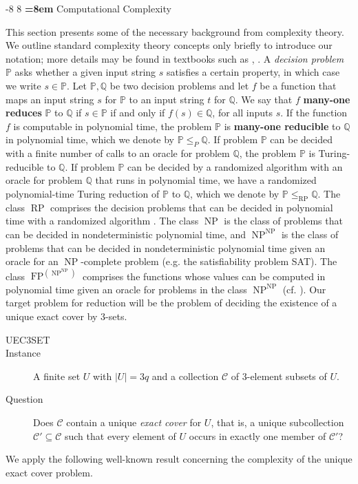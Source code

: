 \documentclass{elsarticle}%
\makeatletter
\renewcommand\subsection{\@startsection {subsection}{1}{\z@}%
  {-8\p@ \@plus -4\p@ \@minus -4\p@}%
                       {8\p@ \@plus 4\p@ \@minus 4\p@}%
                                   {\normalfont\large\bfseries\boldmath
                                   \rightskip=\z@ \@plus 8em\pretolerance=10000 }}
\DeclareMathOperator{\RP}{\mathbf{\mathrm{RP}}}
\DeclareMathOperator{\FP}{\mathbf{\mathrm{FP}}}
\DeclareMathOperator{\NP}{\mathbf{\mathrm{NP}}}
\newcommand{\partC}{\mathcal{C}}
\renewcommand{\P}{\mathbb{P}}
\newcommand{\Q}{\mathbb{Q}}
\makeatother
\begin{document}
\subsection{Computational Complexity} \label{sec:complexity-back}

This section presents some of the necessary background from complexity theory. We outline standard complexity theory concepts only briefly to introduce our notation; more details may be found in textbooks such as \cite{papadimitriou94:_comput}, \cite{Rothe2005}.
A {\em decision problem} $\P$ asks whether a given input string $s$ satisfies a certain property, in which case we write $s \in \P$. Let $\P,\Q$ be two decision problems and let $f$ be a function that maps an input string $s$ for $\P$ to an input string $t$ for $\Q$. We say that $f$ \textbf{many-one reduces} $\P$ to $\Q$ if $s \in \P$ if and only if $f(s) \in \Q$, for all inputs $s$. If the function $f$ is computable in polynomial time, the problem $\P$ is \textbf{ many-one reducible} to $\Q$ in polynomial time, which we denote by $\P \leq_{P} \Q$. If problem $\P$ can be decided with a finite number of calls to an oracle for problem $\Q$, the problem $\P$ is Turing-reducible to $\Q$. If problem $\P$ can be decided by a randomized algorithm with an oracle for problem $\Q$ that runs in polynomial time, we have a randomized polynomial-time Turing
reduction of $\P$ to $\Q$, which we denote by $\P \leq_{\RP} \Q$. The class $\RP$ comprises the decision problems that can be decided in
polynomial time with a randomized algorithm \cite[Def.11.1]{papadimitriou94:_comput}. 
The class $\NP$ is the class of problems that can be decided in nondeterministic polynomial time, and $\NP^{\NP}$ is the class of problems that can be decided in nondeterministic polynomial time given an oracle for an $\NP$-complete problem (e.g. the satisfiability problem \textsc{SAT}). The class %
$\FP^{(\NP^{\NP})}$ comprises the functions whose values can be computed in polynomial time 
given an oracle for problems in the class $\NP^{\NP}$ (cf. \cite[Ch.17.1]{papadimitriou94:_comput}).
Our target problem for reduction will be the problem of deciding the existence of a unique
exact cover by 3-sets.

\begin{description}
\item[\textsc{UEC3SET}]
\item[Instance] A finite set $U$ with $|U|=3q$ and a collection $\partC$ of
3-element subsets of $U$.

\item[Question] Does $\partC$ contain a unique \emph{exact cover} for $U$, that is,
a unique subcollection $\partC'\subseteq \partC$ such that every element of $U$ occurs
in exactly one member of $\partC'$?
\end{description}
We %
apply the following well-known result concerning the complexity of the unique exact cover problem.
\end{document}

